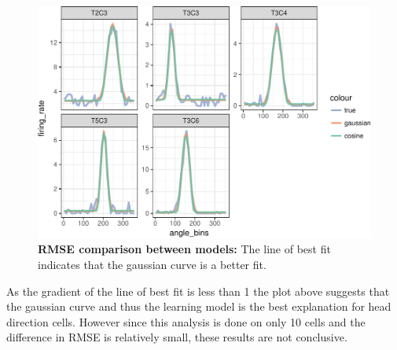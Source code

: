 \documentclass[]{article}
\begin{document}
\begin{figure}[H]

{\centering \includegraphics{project2_files/figure-latex/unnamed-chunk-2-1} 

}

\caption{\label{modelRMSE}\textbf{RMSE comparison between models:} The line of best fit indicates that the gaussian curve is a better fit.}\label{fig:unnamed-chunk-2}
\end{figure}

As the gradient of the line of best fit is less than 1 the plot above
suggests that the gaussian curve and thus the learning model is the best
explanation for head direction cells. However since this analysis is
done on only 10 cells and the difference in RMSE is relatively small,
these results are not conclusive.
\end{document}
